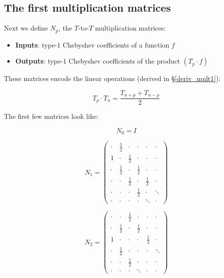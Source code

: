 \documentclass{article}
\begin{document}
\subsection{The first multiplication matrices}

Next we define $N_p$, the $T$-to-$T$ multiplication matrices:

\begin{itemize}
    \item \textbf{Inputs}: type-1 Chebyshev coefficients of a function $f$
    \item \textbf{Outputs}: type-1 Chebyshev coefficients of the product $(T_p \cdot f)$
\end{itemize}

These matrices encode the linear operations (derived in \S \ref{deriv_mult1}):

\begin{equation}
T_p \cdot T_n = \frac{T_{n+p} + T_{n-p}}{2}
\end{equation}

The first few matrices look like:

\begin{equation*}
N_0 = I
\end{equation*}

\begin{equation*}
\renewcommand*{\arraystretch}{1.2}
N_1 =
\begin{pmatrix}
\cdot & \frac{1}{2} & \cdot & \cdot & \cdot & \cdot \\
1 & \cdot & \frac{1}{2} & \cdot & \cdot & \cdot \\
\cdot & \frac{1}{2} & \cdot & \frac{1}{2} & \cdot & \cdot \\
\cdot & \cdot & \frac{1}{2} & \cdot & \frac{1}{2} & \cdot \\
\cdot & \cdot & \cdot & \frac{1}{2} & \cdot & \ddots \\
\cdot & \cdot & \cdot & \cdot & \ddots & \cdot
\end{pmatrix}
\end{equation*}

\begin{equation*}
\renewcommand*{\arraystretch}{1.2}
N_2 =
\begin{pmatrix}
\cdot & \cdot & \frac{1}{2} & \cdot & \cdot & \cdot \\
\cdot & \frac{1}{2} & \cdot & \frac{1}{2} & \cdot & \cdot \\
1 & \cdot & \cdot & \cdot & \frac{1}{2} & \cdot \\
\cdot & \frac{1}{2} & \cdot & \cdot & \cdot & \ddots \\
\cdot & \cdot & \frac{1}{2} & \cdot & \cdot & \cdot \\
\cdot & \cdot & \cdot & \ddots & \cdot & \cdot
\end{pmatrix}
\end{equation*}
\end{document}
